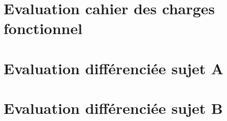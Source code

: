 \section{Evaluation cahier des charges fonctionnel}\label{annexe:evaluation_cdcf}


\section{Evaluation différenciée sujet A}\label{annexe:evaluation_chaine_energie_A}

\section{Evaluation différenciée sujet B}\label{annexe:evaluation_chaine_energie_B}



